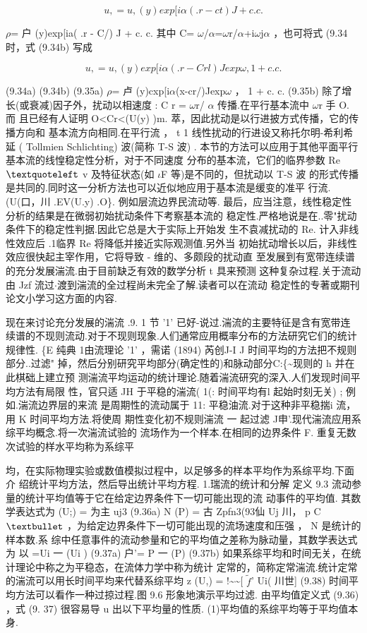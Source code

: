 \[u, = u ,  (y)exp[i\alpha ( .r - ct) J + c. c.\]

$\rho$= 户 (y)exp[ia( .r - C/) J + c. c. 其中 C= $\omega$/$\alpha$=$\omega$r/$\alpha$+i$\omega$j$\alpha$ ，也可将式 (9.34 时，式 (9.34b) 写成

\[u, = u, (y)exp[i\alpha ( .r - Crl) Jexp\omega ,  1 + c. c.\]

(9.34a) (9.34b) (9.35a) $\rho$= 卢 (y)cxp[i$\alpha$(x-cr/)Jexp$\omega$ ， 1 + c. c. (9.35b) 除了增长(或衰减)因子外，扰动以相速度 : C r = $\omega$r/ $\alpha$ 传播.在平行基本流中 $\omega$r 手 O. 而 且已经有人证明 O<Cr<(U(y) )m. 萃，因此扰动是以行进披方式传播，它的传播方向和 基本流方向相同.在平行流 ， t 1 线性扰动的行进设又称托尔明-希利希延 ( Tollmien Schlichting) 波(简称 T-S 波) . 本节的方法可以应用于其他平面平行基本流的线惶稳定性分析，对于不同速度 分布的基本流，它们的临界参数 Re${\rm ‘}$ v 及特征状态(如 $\iota$F 等)是不同的，但扰动以 T-S 波 的形式传播是共同的.同时这一分析方法也可以近似地应用于基本流是缓变的准平 行流. (U(口，川 .EV(U.y) .O\}. 例如层流边界民流动等. 最后，应当注意，线性稳定性分析的结果是在微弱初始扰动条件下考察基本流的 稳定性.严格地说是在..零"扰动条件下的稳定性判据.因此它总是大于实际上开始发 生不袁减扰动的 Re. 计入非线性效应后 .1临界 Re 将降低并接近实际观测值.另外当 初始扰动增长以后，非线性效应很快起主宰作用，它将导致 - 维的、多颇段的扰动直 至发展到有宽带连续谱的充分发展湍流.由于目前缺乏有效的数学分析 t 具来预测 这种复杂过程.关于流动由 Jzf 流过$\cdot $渡到湍流的全过程尚未完全了解.读者可以在流动 稳定性的专著或期刊论文小学习这方面的内容.

现在来讨论充分发展的湍流 .9. 1 节 '1' 已好-说过.湍流的主要特征是含有宽带连 续谱的不现则流动.对于不现则现象.人们通常应用概率分布的方法研究它们的统计 规律性. \{E 纯典 1由流理论 '1' ，需诺 (1894) 芮创J-I J 时间平均的方法把不规则部分..过滤" 掉，然后分别研究平均部分(确定性的)和脉动部分C:\{\textasciitilde{}现则的 h 并在此棋础上建立预 测湍流平均运动的统计理论.随着湍流研究的深入.人们发现时间平均方法有局限 性，官只适 JH 于平稳的湍流( 1(: 时间平均有l 起始时刻无关) ; 例如.湍流边界层的来流 是周期性的流动属于 11: 平稳油流.对于这种非平稳揣i 流，用 K 时间平均方法.将使周 期性变化初不规则湍流 一 起过滤 J申'.现代湍流应用系综平均概念.将一次湍流试验的 流场作为一个样本.在相同的边界条件 F. 重复无数次试验的样水平均称为系综平

均，在实际物理实验或数值模拟过程中，以足够多的样本平均作为系综平均.下面介 绍统计平均方法，然后导出统计平均方程. 1.瑞流的统计和分解 定义 9.3 流动参量的统计平均值等于它在给定边界条件下一切可能出现的流 动事件的平均值. 其数学表达式为 (U;) = 为主 uj3 (9.36a) N (P) = 古 Zpfn3(93仙 Uj 川， p C ${\rm •}$ ，为给定边界条件下一切可能出现的流场速度和压强 ， N 是统计的样本数.系 综中任意事件的流动参量和它的平均值之差称为脉动量，其数学表达式为 以 =Ui 一 (Ui ) (9.37a) 户'= P 一 (P) (9.37b) 如果系综平均和时间无关，在统计理论中称之为平稳态，在流体力学中称为统计 定常的，简称定常湍流.统计定常的湍流可以用长时间平均来代替系综平均 z (U,) = !\textasciitilde{}\textasciitilde{}[ $\tilde{f}$' Ui( 川世] (9.38) 时间平均方法可以看作一种过掠过程.图 9.6 形象地演示平均过滤. 由平均值定义式 (9.36) ，式 (9. 37) 很容易导 u 出以下平均量的性质. (1)平均值的系综平均等于平均值本身.

